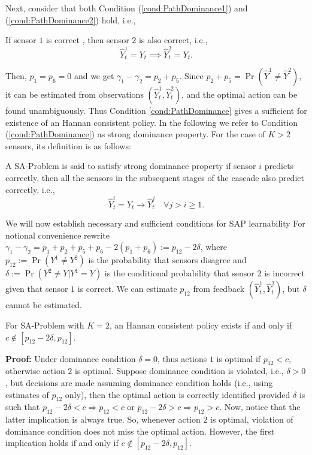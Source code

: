 Next, consider that both Condition (\ref{cond:PathDominance1}) and (\ref{cond:PathDominance2}) hold, i.e.,  
\begin{condition}
	\label{cond:PathDominance}
	If sensor $1$ is correct , then sensor $2$ is also correct, i.e.,
	\begin{equation*}
	\label{eqn:Dominace} 
	 \hat{Y}_t^1=Y_t \implies \hat{Y}^2_t=Y_t. 
	\end{equation*}
\end{condition}
Then, $p_1=p_6=0$ and we get $\gamma_1-\gamma_2=p_2+p_5$. Since $p_2+p_5=\Pr(\hat{Y}^1 \neq \hat{Y}^2)$, it can be estimated from observations $(\hat{Y}_t^1,\hat{Y}_t^2)$, and the optimal action can be found unambiguously. Thus Condition \ref{cond:PathDominance} gives a sufficient for existence of an Hannan consistent policy. In the following we refer to Condition (\ref{cond:PathDominance}) as strong dominance property. For the case of $K>2$ sensors, its definition is as follows: 

\begin{definition}
	A SA-Problem is said to satisfy strong dominance property if sensor $i$ predicts correctly, then all the sensors in the subsequent stages of the cascade also predict correctly, i.e.,
	\begin{equation}
	\label{eqn:DominanceCondition}
	\hat{Y}_t^i=Y_t \rightarrow \hat{Y}_t^j \quad \forall j>i\geq 1.
	\end{equation}
\end{definition}

We will now establish necessary and sufficient conditions for SAP learnability
For notional convenience rewrite 
$\gamma_1- \gamma_2= p_1+p_2+p_5+p_6- 2(p_1+p_6):=p_{12}-2\delta$,
where $p_{12}:=\Pr(Y^1\neq Y^2)$ is the probability that sensors disagree and $\delta:=\Pr(Y^2 \neq Y | Y^1=Y)$ is the conditional probability that sensor $2$ is incorrect given that sensor $1$ is correct. We can estimate $p_{12}$ from feedback $(\hat{Y}^1_t, \hat{Y}^2_t)$, but $\delta$ cannot be estimated.
\begin{thm}
For SA-Problem with $K=2$, an Hannan consistent policy exists if and only if $c \notin [p_{12}-2\delta, p_{12}]$.
\end{thm}
{\bf Proof:} Under dominance condition $\delta=0$, thus actions $1$ is optimal if $p_{12}<c$, otherwise action $2$ is optimal. Suppose dominance condition is violated, i.e., $\delta>0$, but decisions are made assuming dominance condition holds (i.e., using estimates of $p_{12}$ only), then the optimal action is correctly identified provided $\delta$ is such that $p_{12}-2\delta < c \Rightarrow p_{12} <c$ or $p_{12}-2\delta >c \Rightarrow p_{12}>c$. Now, notice that the latter implication is always true. So, whenever action $2$ is optimal, violation of dominance condition does not miss the optimal action. However, the first implication holds if and only if $c \notin [p_{12}-2\delta, p_{12}]$.

